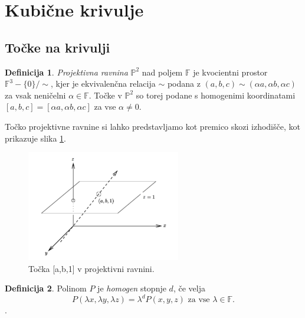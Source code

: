 \documentclass[12pt,a4paper,twoside]{article}
\theoremstyle{definition} %
\newtheorem{definicija}{Definicija}[section]
\theoremstyle{plain} %
\numberwithin{equation}{section}  %
\newcommand{\F}{\mathbb F}
\begin{document}
\newpage

\section{Kubične krivulje}

\subsection{Točke na krivulji}

\begin{definicija}
\emph{Projektivna ravnina} $\mathbb{P}^2$ nad poljem $\F$ je kvocientni prostor $\F^3-\{0\}/\! \!\sim$, kjer je ekvivalenčna relacija $\sim$ podana z $(a,b,c)\sim(\alpha a,\alpha b,\alpha c)$ za vsak  neničelni $\alpha \in \F$. Točke v $\mathbb{P}^2$ so torej podane s homogenimi koordinatami $[a,b,c] = [\alpha a,\alpha b,\alpha c]$ za vse $\alpha \neq 0$.
\end{definicija} 

Točko projektivne ravnine si lahko predstavljamo kot premico skozi izhodišče, kot prikazuje slika \ref{fig:ravnina}.


\begin{figure}[h]
  \centering
  \includegraphics[width=0.6\textwidth]{images/ravnina.png}
  \caption[Primer točke v projektivni ravnini.]{Točka [a,b,1] v projektivni ravnini.}
  \label{fig:ravnina}
\end{figure}


\begin{definicija}
Polinom $P$ je \emph{homogen} stopnje $d$, če velja $$P(\lambda x,\lambda y, \lambda z) = \lambda ^d P(x,y,z) \text{ za vse } \lambda \in \F.$$.
\end{definicija}
\end{document}
